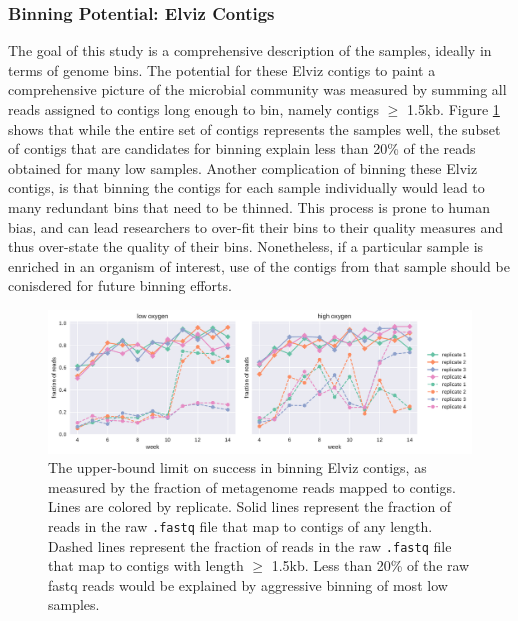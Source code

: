 \subsubsection{Binning Potential: Elviz Contigs}

The goal of this study is a comprehensive description of the samples, ideally in terms of genome bins.
The potential for these Elviz contigs to paint a comprehensive picture of the microbial community was measured by summing all reads assigned to contigs long enough to bin, namely contigs $\geq$ 1.5kb.
Figure \ref{fig:dont_bin_Elviz} shows that while the entire set of contigs represents the samples well, the subset of contigs that are candidates for binning explain less than 20\% of the reads obtained for many low  samples.
Another complication of binning these Elviz contigs, is that binning the contigs for each sample individually would lead to many redundant bins that need to be thinned.
This process is prone to human bias, and can lead researchers to over-fit their bins to their quality measures and thus over-state the quality of their bins.
Nonetheless, if a particular sample is enriched in an organism of interest, use of the contigs from that sample should be conisdered for future binning efforts.


\begin{figure}[H]
\centering
    \includegraphics[width=1.0\textwidth]{./tex/chapter2/figures/170314_Elviz_is_not_for_binning--landscape.pdf}  %
    \begin{singlespace}
    \caption[Upper-bound limit on success of binning Elviz contigs]{
        The upper-bound limit on success in binning Elviz contigs, as measured by the fraction of metagenome reads mapped to contigs.
        Lines are colored by replicate.
        Solid lines represent the fraction of reads in the raw \texttt{.fastq} file that map to contigs of any length.
        Dashed lines represent the fraction of reads in the raw \texttt{.fastq} file that map to contigs with length $\geq$ 1.5kb.
        Less than 20\% of the raw fastq reads would be explained by aggressive binning of most low  samples.}
    \label{fig:dont_bin_Elviz}
    \end{singlespace}
\end{figure}

